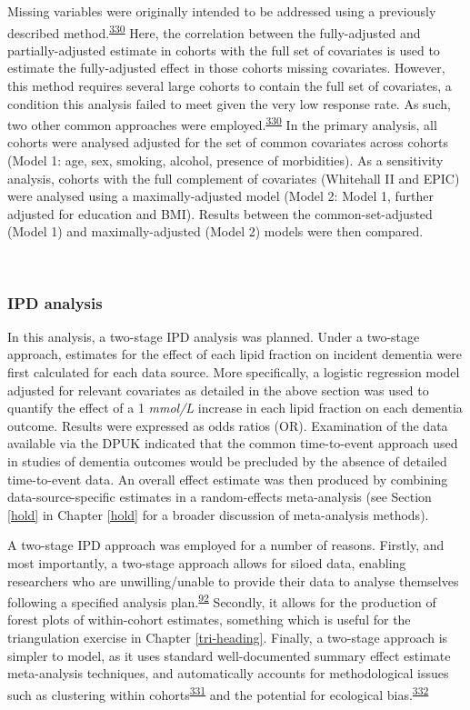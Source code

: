 \documentclass[a4paper, twoside]{templates/ociamthesis}
\begin{document}
Missing variables were originally intended to be addressed using a previously described method.\textsuperscript{\protect\hyperlink{ref-fibrinogenstudiescollaboration2009}{330}} Here, the correlation between the fully-adjusted and partially-adjusted estimate in cohorts with the full set of covariates is used to estimate the fully-adjusted effect in those cohorts missing covariates. However, this method requires several large cohorts to contain the full set of covariates, a condition this analysis failed to meet given the very low response rate. As such, two other common approaches were employed.\textsuperscript{\protect\hyperlink{ref-fibrinogenstudiescollaboration2009}{330}} In the primary analysis, all cohorts were analysed adjusted for the set of common covariates across cohorts (Model 1: age, sex, smoking, alcohol, presence of morbidities). As a sensitivity analysis, cohorts with the full complement of covariates (Whitehall II and EPIC) were analysed using a maximally-adjusted model (Model 2: Model 1, further adjusted for education and BMI). Results between the common-set-adjusted (Model 1) and maximally-adjusted (Model 2) models were then compared.

~

\hypertarget{ipd-analysis}{%
\subsubsection{IPD analysis}\label{ipd-analysis}}

In this analysis, a two-stage IPD analysis was planned. Under a two-stage approach, estimates for the effect of each lipid fraction on incident dementia were first calculated for each data source. More specifically, a logistic regression model adjusted for relevant covariates as detailed in the above section was used to quantify the effect of a 1 \emph{mmol/L} increase in each lipid fraction on each dementia outcome. Results were expressed as odds ratios (OR). Examination of the data available via the DPUK indicated that the common time-to-event approach used in studies of dementia outcomes would be precluded by the absence of detailed time-to-event data. An overall effect estimate was then produced by combining data-source-specific estimates in a random-effects meta-analysis (see Section \ref{hold} in Chapter \ref{hold} for a broader discussion of meta-analysis methods).

A two-stage IPD approach was employed for a number of reasons. Firstly, and most importantly, a two-stage approach allows for siloed data, enabling researchers who are unwilling/unable to provide their data to analyse themselves following a specified analysis plan.\textsuperscript{\protect\hyperlink{ref-riley2010}{92}} Secondly, it allows for the production of forest plots of within-cohort estimates, something which is useful for the triangulation exercise in Chapter \ref{tri-heading}. Finally, a two-stage approach is simpler to model, as it uses standard well-documented summary effect estimate meta-analysis techniques, and automatically accounts for methodological issues such as clustering within cohorts\textsuperscript{\protect\hyperlink{ref-abo-zaid2013}{331}} and the potential for ecological bias.\textsuperscript{\protect\hyperlink{ref-burke2017}{332}}
\end{document}
